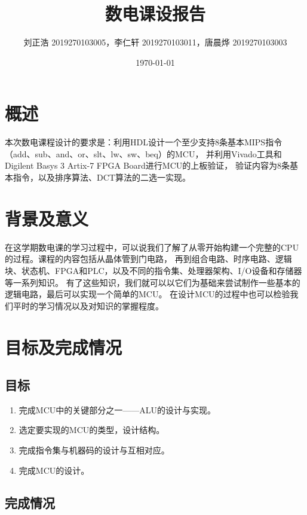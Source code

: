\documentclass[a4paper]{article}
\title{\heiti\zihao{2} 数电课设报告}				%
\author{\songti 刘正浩 2019270103005，李仁轩 2019270103011，唐晨烨 2019270103003}
\date{\today}
\begin{document}
	\maketitle
	\thispagestyle{empty}


\tableofcontents
\newpage
	\section{概述}
		本次数电课程设计的要求是：利用HDL设计一个至少支持8条基本MIPS指令（add、sub、and、or、slt、lw、sw、beq）的MCU，
		并利用Vivado\textregistered 工具和Digilent Basys 3 Artix-7 FPGA Board进行MCU的上板验证，
		验证内容为8条基本指令，以及排序算法、DCT算法的二选一实现。\par
	\section{背景及意义}
		在这学期数电课的学习过程中，可以说我们了解了从零开始构建一个完整的CPU的过程。课程的内容包括从晶体管到门电路，
		再到组合电路、时序电路、逻辑块、状态机、FPGA和PLC，以及不同的指令集、处理器架构、I/O设备和存储器等一系列知识。
		有了这些知识，我们就可以以它们为基础来尝试制作一些基本的逻辑电路，最后可以实现一个简单的MCU。
		在设计MCU的过程中也可以检验我们平时的学习情况以及对知识的掌握程度。\par
	\section{目标及完成情况}
		\subsection{目标}
		\begin{enumerate}
			\item 完成MCU中的关键部分之一——ALU的设计与实现。
			\item 选定要实现的MCU的类型，设计结构。
			\item 完成指令集与机器码的设计与互相对应。
			\item 完成MCU的设计。
		\end{enumerate}
		\subsection{完成情况}
\end{document}
